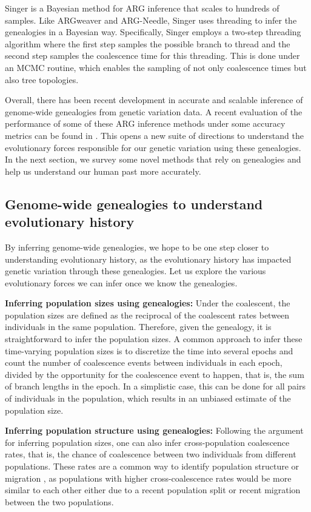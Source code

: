 Singer \cite{deng2024robust} is a Bayesian method for ARG inference that scales to hundreds of samples. Like ARGweaver and ARG-Needle, Singer uses threading to infer the genealogies in a Bayesian way. Specifically, Singer employs a two-step threading algorithm where the first step samples the possible branch to thread and the second step samples the coalescence time for this threading. This is done under an MCMC routine, which enables the sampling of not only coalescence times but also tree topologies.

Overall, there has been recent development in accurate and scalable inference of genome-wide genealogies from genetic variation data. A recent evaluation of the performance of some of these ARG inference methods under some accuracy metrics can be found in \cite{brandt2022evaluation}. This opens a new suite of directions to understand the evolutionary forces responsible for our genetic variation using these genealogies. In the next section, we survey some novel methods that rely on genealogies and help us understand our human past more accurately.

\subsection{Genome-wide genealogies to understand evolutionary history}

By inferring genome-wide genealogies, we hope to be one step closer to understanding evolutionary history, as the evolutionary history has impacted genetic variation through these genealogies. Let us explore the various evolutionary forces we can infer once we know the genealogies.

\textbf{Inferring population sizes using genealogies:} Under the coalescent, the population sizes are defined as the reciprocal of the coalescent rates between individuals in the same population. Therefore, given the genealogy, it is straightforward to infer the population sizes. A common approach to infer these time-varying population sizes is to discretize the time into several epochs and count the number of coalescence events between individuals in each epoch, divided by the opportunity for the coalescence event to happen, that is, the sum of branch lengths in the epoch. In a simplistic case, this can be done for all pairs of individuals in the population, which results in an unbiased estimate of the population size.

\textbf{Inferring population structure using genealogies:} Following the argument for inferring population sizes, one can also infer cross-population coalescence rates, that is, the chance of coalescence between two individuals from different populations. These rates are a common way to identify population structure or migration \cite{schiffels2014inferring}, as populations with higher cross-coalescence rates would be more similar to each other either due to a recent population split or recent migration between the two populations.

